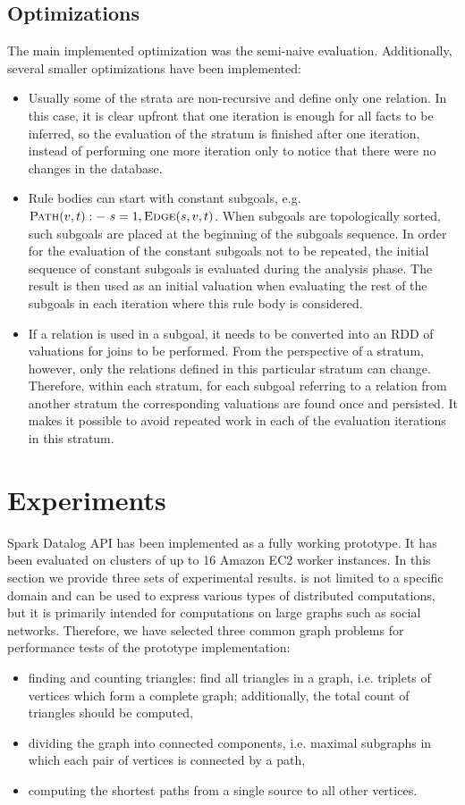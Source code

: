 \subsection{Optimizations}
The main implemented optimization was the semi-naive evaluation. Additionally, several smaller optimizations have been implemented:
\begin{itemize}
\item Usually some of the strata are non-recursive and define only one relation. In this case, it is clear upfront that one iteration is enough for all facts to be inferred, so the evaluation of the stratum is finished after one iteration, instead of performing one more iteration only to notice that there were no changes in the database.
\item Rule bodies can start with constant subgoals, e.g. $\textsc{Path}(v,t) :-~s=1, \textsc{Edge}(s, v, t)$. When subgoals are topologically sorted, such subgoals are placed at the beginning of the subgoals sequence. In order for the evaluation of the constant subgoals not to be repeated, the initial sequence of constant subgoals is evaluated during the analysis phase. The result is then used as an initial valuation when evaluating the rest of the subgoals in each iteration where this rule body is considered.
\item If a relation is used in a subgoal, it needs to be converted into an RDD of valuations for joins to be performed. From the perspective of a stratum, however, only the relations defined in this particular stratum can change. Therefore, within each stratum, for each subgoal referring to a relation from another stratum the corresponding valuations are found once and persisted. It makes it possible to avoid repeated work in each of the evaluation iterations in this stratum.
\end{itemize}

\section{Experiments}\label{s:impl_eval}
Spark Datalog API has been implemented as a fully working prototype. It has been evaluated on clusters of up to 16 Amazon EC2 worker instances. In this section we provide three sets of experimental results. \datalogra is not limited to a specific domain and can be used to express various types of distributed computations, but it is primarily intended for computations on large graphs such as social networks. Therefore, we have selected three common graph problems \cite{ullman, pregel} for performance tests of the prototype implementation:
\begin{itemize}
\item finding and counting triangles: find all triangles in a graph, i.e. triplets of vertices which form a complete graph; additionally, the total count of triangles should be computed,
\item dividing the graph into connected components, i.e. maximal subgraphs in which each pair of vertices is connected by a path,
\item computing the shortest paths from a single source to all other vertices.
\end{itemize}

